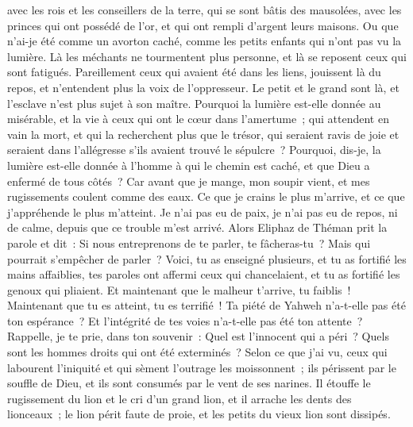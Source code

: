 \begin{multicols}{2}
avec les rois et les conseillers de la terre, qui se sont bâtis des mausolées,
avec les princes qui ont possédé de l'or, et qui ont rempli d'argent leurs maisons.
Ou que n'ai-je été comme un avorton caché, comme les petits enfants qui n'ont pas vu la lumière.
Là les méchants ne tourmentent plus personne, et là se reposent ceux qui sont fatigués.
Pareillement ceux qui avaient été dans les liens, jouissent là du repos, et n'entendent plus la voix de l'oppresseur.
Le petit et le grand sont là, et l'esclave n'est plus sujet à son maître.
Pourquoi la lumière est-elle donnée au misérable, et la vie à ceux qui ont le cœur dans l'amertume~;
qui attendent en vain la mort, et qui la recherchent plus que le trésor,
qui seraient ravis de joie et seraient dans l'allégresse s'ils avaient trouvé le sépulcre~?
Pourquoi, dis-je, la lumière est-elle donnée à l'homme à qui le chemin est caché, et que Dieu a enfermé de tous côtés~?
Car avant que je mange, mon soupir vient, et mes rugissements coulent comme des eaux.
Ce que je crains le plus m'arrive, et ce que j'appréhende le plus m'atteint.
Je n'ai pas eu de paix, je n'ai pas eu de repos, ni de calme, depuis que ce trouble m'est arrivé.
\VerseOne{}Alors Eliphaz de Théman prit la parole et dit~:
Si nous entreprenons de te parler, te fâcheras-tu~? Mais qui pourrait s'empêcher de parler~?
Voici, tu as enseigné plusieurs, et tu as fortifié les mains affaiblies,
tes paroles ont affermi ceux qui chancelaient, et tu as fortifié les genoux qui pliaient.
Et maintenant que le malheur t'arrive, tu faiblis~! Maintenant que tu es atteint, tu es terrifié~!
 Ta piété de Yahweh n'a-t-elle pas été ton espérance~? Et l'intégrité de tes voies n'a-t-elle pas été ton attente~?
Rappelle, je te prie, dans ton souvenir~: Quel est l'innocent qui a péri~? Quels sont les hommes droits qui ont été exterminés~?
Selon ce que j'ai vu, ceux qui labourent l'iniquité et qui sèment l'outrage les moissonnent~;
ils périssent par le souffle de Dieu, et ils sont consumés par le vent de ses narines.
Il étouffe le rugissement du lion et le cri d'un grand lion, et il arrache les dents des lionceaux~;
le lion périt faute de proie, et les petits du vieux lion sont dissipés.

\end{multicols}
